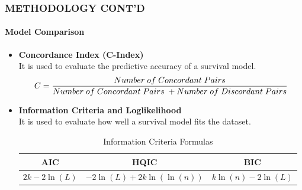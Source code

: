 \documentclass[12pt]{beamer}
\begin{document}
\begin{frame}
    \frametitle{METHODOLOGY CONT'D}
        \framesubtitle{Model Comparison}  

    \begin{itemize}
        \item \textbf{Concordance Index (C-Index)}\\
        It is used to evaluate the predictive accuracy of a survival model. 
        \begin{equation} \scriptsize
        C=\frac{Number\ of\ Concordant\ Pairs}{Number\ of\ Concordant\ Pairs\ +Number\ of\ Discordant\ Pairs}
        \end{equation}
        \item \textbf{Information Criteria and Loglikelihood}\\
        It is used to evaluate how well a survival model fits the dataset.
        \begin{table}[H]
        \centering
        \begin{tabular}{|c|c|c|}
        \hline
         \textbf{AIC} & \textbf{HQIC} & \textbf{BIC} \\
        \hline
         \(2k - 2\ln(L)\) & \(-2\ln(L) + 2k\ln(\ln(n))\) & \(k\ln(n) - 2\ln(L)\) \\
        \hline
        \end{tabular}
        \caption{Information Criteria Formulas}
        \label{table:info_criteria}
        \end{table}
    \end{itemize}
\end{frame}
  

	
\end{document}

